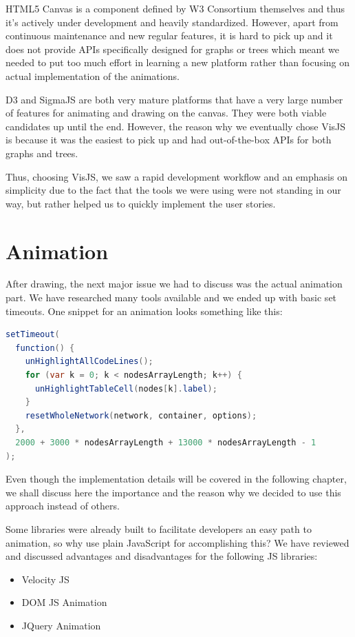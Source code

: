\documentclass{l4proj}
\begin{document}
HTML5 Canvas is a component defined by W3 Consortium themselves and thus it's actively under development and heavily
standardized. However, apart from continuous maintenance and new regular features, it is hard to pick up and it does
not provide APIs specifically designed for graphs or trees which meant we needed to put too much effort in learning a
new platform rather than focusing on actual implementation of the animations.

D3 and SigmaJS are both very mature platforms that have a very large number of features for animating and drawing on
the canvas. They were both viable candidates up until the end. However, the reason why we eventually chose VisJS
is because it was the easiest to pick up and had out-of-the-box APIs for both graphs and trees. 

Thus, choosing VisJS, we saw a rapid development workflow and an emphasis on simplicity due to the fact that the tools
we were using were not standing in our way, but rather helped us to quickly implement the user stories.

\section{Animation}

After drawing, the next major issue we had to discuss was the actual animation part. We have researched many tools
available and we ended up with basic set timeouts. One snippet for an animation looks something like this:

\begin{lstlisting}[language=Java, caption=JavaScript snippet for creating an animation]
setTimeout(
  function() {
    unHighlightAllCodeLines();
    for (var k = 0; k < nodesArrayLength; k++) {
      unHighlightTableCell(nodes[k].label);
    }
    resetWholeNetwork(network, container, options);
  },
  2000 + 3000 * nodesArrayLength + 13000 * nodesArrayLength - 1
);
\end{lstlisting}

Even though the implementation details will be covered in the following chapter, we shall discuss here the importance
and the reason why we decided to use this approach instead of others.

Some libraries were already built to facilitate developers an easy path to animation, so why use plain JavaScript for
accomplishing this? We have reviewed and discussed advantages and disadvantages for the following JS libraries:

\begin{itemize}
    \item Velocity JS
    \item DOM JS Animation
    \item JQuery Animation
\end{itemize}
\end{document}
